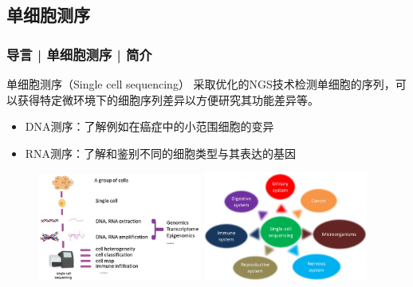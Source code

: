 \documentclass[11pt]{ctexbeamer}
\begin{document}
\subsection{单细胞测序}
\begin{frame}
  \frametitle{导言 | 单细胞测序 | 简介}
  \begin{block}{单细胞测序（Single cell sequencing）}
    采取优化的NGS技术检测单细胞的序列，可以获得特定微环境下的细胞序列差异以方便研究其功能差异等。
    \begin{itemize}
      \item DNA测序：了解例如在癌症中的小范围细胞的变异
      \item RNA测序：了解和鉴别不同的细胞类型与其表达的基因
    \end{itemize}
  \end{block}
  \begin{figure}
    \centering
    \includegraphics[width=0.48\textwidth]{sc_seq_03.png}
    \includegraphics[width=0.48\textwidth]{sc_seq_04.png}
  \end{figure}
\end{frame}
\end{document}
